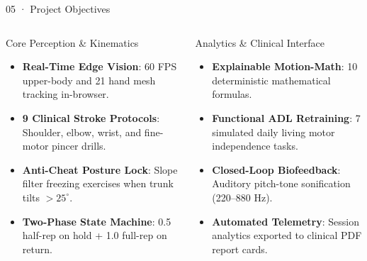 \documentclass[aspectratio=169,11pt]{beamer}
\begin{document}
\begin{frame}{05 · Project Objectives}
\begin{columns}[T]
\begin{block}{Core Perception \& Kinematics}
\begin{itemize}
    \setlength{\itemsep}{2pt}
    \item \textbf{Real-Time Edge Vision}: 60 FPS upper-body and 21 hand mesh tracking in-browser.
    \item \textbf{9 Clinical Stroke Protocols}: Shoulder, elbow, wrist, and fine-motor pincer drills.
    \item \textbf{Anti-Cheat Posture Lock}: Slope filter freezing exercises when trunk tilts $>25^\circ$.
    \item \textbf{Two-Phase State Machine}: 0.5 half-rep on hold + 1.0 full-rep on return.
\end{itemize}
\end{block}

\begin{block}{Analytics \& Clinical Interface}
\begin{itemize}
    \setlength{\itemsep}{2pt}
    \item \textbf{Explainable Motion-Math}: 10 deterministic mathematical formulas.
    \item \textbf{Functional ADL Retraining}: 7 simulated daily living motor independence tasks.
    \item \textbf{Closed-Loop Biofeedback}: Auditory pitch-tone sonification (220--880 Hz).
    \item \textbf{Automated Telemetry}: Session analytics exported to clinical PDF report cards.
\end{itemize}
\end{block}
\end{columns}
\end{frame}
\end{document}
